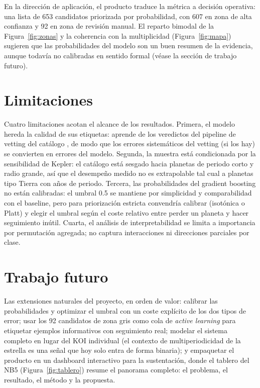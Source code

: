 \documentclass[a4paper,12pt]{article}
\begin{document}
  En la dirección de aplicación, el producto traduce la métrica a decisión
  operativa: una lista de 653 candidatos priorizada por probabilidad, con 607 en
  zona de alta confianza y 92 en zona de revisión manual. El reparto bimodal de la
  Figura~\ref{fig:zonas} y la coherencia con la multiplicidad
  (Figura~\ref{fig:mapa}) sugieren que las probabilidades del modelo son un buen
  resumen de la evidencia, aunque todavía no calibradas en sentido formal
  (véase la sección de trabajo futuro).

  \section{Limitaciones}

  Cuatro limitaciones acotan el alcance de los resultados. Primera, el modelo
  hereda la calidad de sus etiquetas: aprende de los veredictos del pipeline de
  vetting del catálogo \cite{thompson2018}, de modo que los errores sistemáticos
  del vetting (si los hay) se convierten en errores del modelo. Segunda, la
  muestra está condicionada por la sensibilidad de Kepler: el catálogo está
  sesgado hacia planetas de periodo corto y radio grande, así que el desempeño
  medido no es extrapolable tal cual a planetas tipo Tierra con años de periodo.
  Tercera, las probabilidades del gradient boosting no están calibradas: el
  umbral 0.5 se mantiene por simplicidad y comparabilidad con el baseline, pero
  para priorización estricta convendría calibrar (isotónica o Platt) y elegir el
  umbral según el coste relativo entre perder un planeta y hacer seguimiento
  inútil. Cuarta, el análisis de interpretabilidad se limita a importancia por
  permutación agregada; no captura interacciones ni direcciones parciales por
  clase.

  \section{Trabajo futuro}

  Las extensiones naturales del proyecto, en orden de valor: calibrar las
  probabilidades y optimizar el umbral con un coste explícito de los dos tipos de
  error; usar los 92 candidatos de zona gris como cola de \textit{active
  learning} para etiquetar ejemplos informativos con seguimiento real; modelar el
  sistema completo en lugar del KOI individual (el contexto de multiperiodicidad
  de la estrella es una señal que hoy solo entra de forma binaria); y empaquetar
  el producto en un dashboard interactivo para la sustentación, donde el tablero
  del NB5 (Figura~\ref{fig:tablero}) resume el panorama completo: el problema, el
  resultado, el método y la propuesta.
\end{document}
